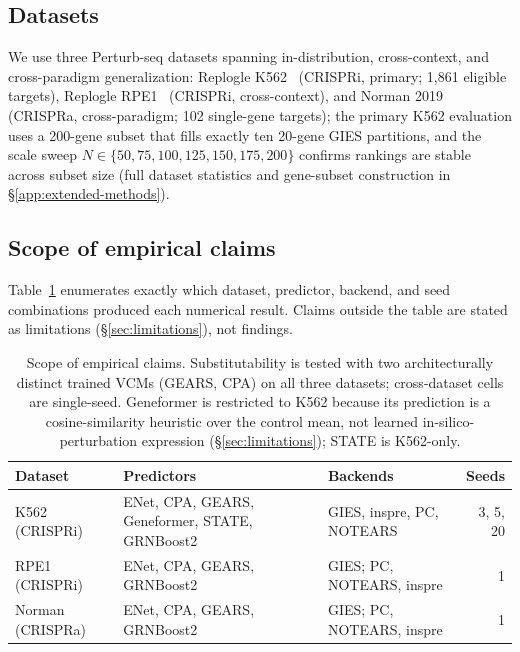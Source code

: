 \documentclass{article}
\theoremstyle{plain}
\theoremstyle{definition}
\theoremstyle{remark}
\begin{document}
\subsection{Datasets}
We use three Perturb-seq datasets spanning in-distribution, cross-context, and cross-paradigm generalization: Replogle K562~\citep{replogle2022} (CRISPRi, primary; 1{,}861 eligible targets), Replogle RPE1~\citep{peidli2024scperturb} (CRISPRi, cross-context), and Norman 2019~\citep{norman2019} (CRISPRa, cross-paradigm; 102 single-gene targets); the primary K562 evaluation uses a 200-gene subset that fills exactly ten 20-gene GIES partitions, and the scale sweep $N\in\{50,75,100,125,150,175,200\}$ confirms rankings are stable across subset size (full dataset statistics and gene-subset construction in \S\ref{app:extended-methods}).

\subsection{Scope of empirical claims}
\label{sec:scope}
Table~\ref{tab:scope} enumerates exactly which dataset, predictor, backend, and seed combinations produced each numerical result. Claims outside the table are stated as limitations (\S\ref{sec:limitations}), not findings.

\begin{table}[t]
\centering
\small
\begin{tabular}{l p{6.1cm} l r}
\toprule
\textbf{Dataset} & \textbf{Predictors} & \textbf{Backends} & \textbf{Seeds} \\
\midrule
K562 (CRISPRi)   & ENet, CPA, GEARS, Geneformer, STATE, GRNBoost2 & GIES, inspre, PC, NOTEARS & 3, 5, 20 \\
RPE1 (CRISPRi)   & ENet, CPA, GEARS, GRNBoost2                    & GIES; PC, NOTEARS, inspre & 1 \\
Norman (CRISPRa) & ENet, CPA, GEARS, GRNBoost2                    & GIES; PC, NOTEARS, inspre & 1 \\
\bottomrule
\end{tabular}
\caption{Scope of empirical claims. Substitutability is tested with two architecturally distinct trained VCMs (GEARS, CPA) on all three datasets; cross-dataset cells are single-seed. Geneformer is restricted to K562 because its prediction is a cosine-similarity heuristic over the control mean, not learned in-silico-perturbation expression (\S\ref{sec:limitations}); STATE is K562-only.}
\label{tab:scope}
\end{table}
\end{document}
